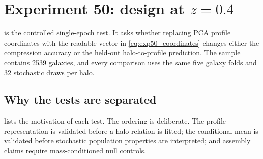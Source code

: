 \section{Experiment 50: design at \texorpdfstring{$z=0.4$}{z=0.4}}
\label{sec:exp50_methods}

\ExpFifty{} is the controlled single-epoch test. It asks whether replacing PCA
profile coordinates with the readable vector in \cref{eq:exp50_coordinates}
changes either the compression accuracy or the held-out halo-to-profile
prediction. The sample contains 2539 galaxies, and every comparison uses the
same five galaxy folds and 32 stochastic draws per halo.

\subsection{Why the tests are separated}

 lists the motivation of each test. The ordering is
deliberate. The profile representation is validated before a halo relation is
fitted; the conditional mean is validated before stochastic population
properties are interpreted; and assembly claims require mass-conditioned null
controls.

